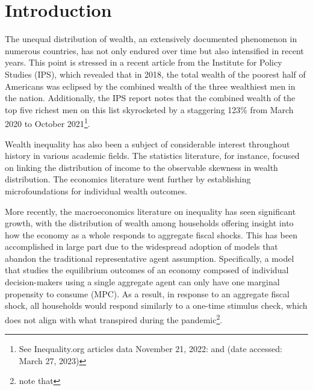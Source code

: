 \documentclass[\econtexRoot/Chp1proposal]{subfiles}
\begin{document}
\hypertarget{Introduction}{}
\section{Introduction}\notinsubfile{\label{sec:intro}}
\setcounter{page}{0}


\par The unequal distribution of wealth, an extensively documented phenomenon in numerous countries, has not only endured over time but also intensified in recent years. This point is stressed in a recent article from the Institute for Policy Studies (IPS), which revealed that in 2018, the total wealth of the poorest half of Americans was eclipsed by the combined wealth of the three wealthiest men in the nation. Additionally, the IPS report notes that the combined wealth of the top five richest men on this list skyrocketed by a staggering 123\% from March 2020 to October 2021\footnote{See Inequality.org articles data November 21, 2022:  and  (date accessed: March 27, 2023)}.

\par Wealth inequality has also been a subject of considerable interest throughout history in various academic fields. The statistics literature, for instance, focused on linking the distribution of income to the observable skewness in wealth distribution. The economics literature went further by establishing microfoundations for individual wealth outcomes.

\par More recently, the macroeconomics literature on inequality has seen significant growth, with the distribution of wealth among households offering insight into how the economy as a whole responds to aggregate fiscal shocks. This has been accomplished in large part due to the widespread adoption of models that abandon the traditional representative agent assumption. Specifically, a model that studies the equilibrium outcomes of an economy composed of individual decision-makers using a single aggregate agent can only have one marginal propensity to consume (MPC). As a result, in response to an aggregate fiscal shock, all households would respond similarly to a one-time stimulus check, which does not align with what transpired during the pandemic\footnote{\cite{jpjsledj2022} note that }. 
\end{document}

